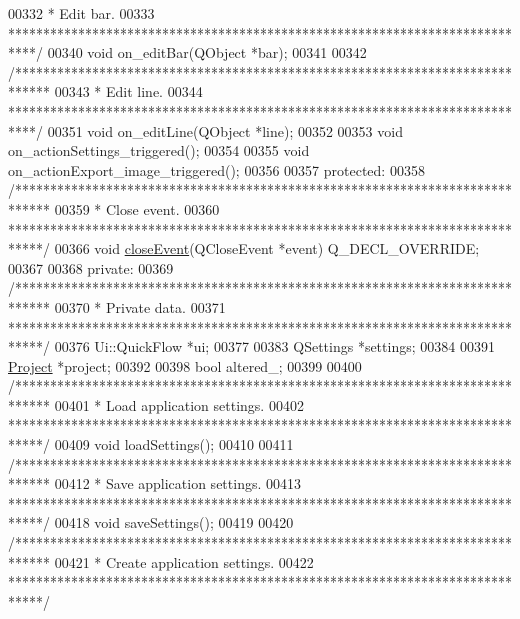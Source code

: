 \begin{DoxyCode}
00332 \textcolor{comment}{   * Edit bar.}
00333 \textcolor{comment}{   ****************************************************************************/}
00340   \textcolor{keywordtype}{void} on\_editBar(QObject *bar);
00341 
00342   \textcolor{comment}{/*****************************************************************************}
00343 \textcolor{comment}{   * Edit line.}
00344 \textcolor{comment}{   ****************************************************************************/}
00351   \textcolor{keywordtype}{void} on\_editLine(QObject *line);
00352 
00353   \textcolor{keywordtype}{void} on\_actionSettings\_triggered();
00354   
00355   \textcolor{keywordtype}{void} on\_actionExport\_image\_triggered();
00356   
00357 \textcolor{keyword}{protected}:
00358   \textcolor{comment}{/*****************************************************************************}
00359 \textcolor{comment}{  * Close event.}
00360 \textcolor{comment}{  *****************************************************************************/}
00366   \textcolor{keywordtype}{void} \hyperlink{group___window_gac8cc1bb329961a0781ffed7b6f2ab402}{closeEvent}(QCloseEvent *event) Q\_DECL\_OVERRIDE;
00367 
00368 \textcolor{keyword}{private}:
00369   \textcolor{comment}{/*****************************************************************************}
00370 \textcolor{comment}{  * Private data.}
00371 \textcolor{comment}{  *****************************************************************************/}
00376   Ui::QuickFlow *ui;
00377 
00383   QSettings *settings;
00384 
00391   \hyperlink{class_project}{Project} *project;
00392 
00398   \textcolor{keywordtype}{bool} altered\_;
00399 
00400   \textcolor{comment}{/*****************************************************************************}
00401 \textcolor{comment}{  * Load application settings.}
00402 \textcolor{comment}{  *****************************************************************************/}
00409   \textcolor{keywordtype}{void} loadSettings();
00410 
00411   \textcolor{comment}{/*****************************************************************************}
00412 \textcolor{comment}{  * Save application settings.}
00413 \textcolor{comment}{  *****************************************************************************/}
00418   \textcolor{keywordtype}{void} saveSettings();
00419 
00420   \textcolor{comment}{/*****************************************************************************}
00421 \textcolor{comment}{  * Create application settings.}
00422 \textcolor{comment}{  *****************************************************************************/}

\end{DoxyCode}
